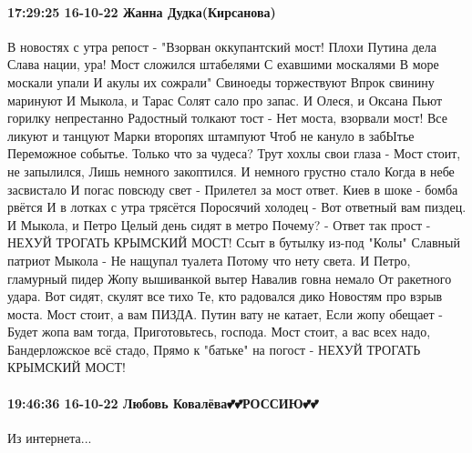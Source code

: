  
 
 
 
 

\paragraph{17:29:25 16-10-22 Жанна Дудка(Кирсанова)}

В новостях с утра репост -
"Взорван оккупантский мост!
Плохи Путина дела
Слава нации, ура!
Мост сложился штабелями
С ехавшими москалями
В море москали упали
И акулы их сожрали"
Свиноеды торжествуют
Впрок свинину маринуют
И Мыкола, и Тарас
Солят сало про запас.
И Олеся, и Оксана
Пьют горилку непрестанно
Радостный толкают тост -
Нет моста, взорвали мост!
Все ликуют и танцуют
Марки второпях штампуют
Чтоб не кануло в забЫтье
Переможное событье.
Только что за чудеса?
Трут хохлы свои глаза -
Мост стоит, не запылился,
Лишь немного закоптился.
И немного грустно стало
Когда в небе засвистало
И погас повсюду свет -
Прилетел за мост ответ.
Киев в шоке - бомба рвётся
И в лотках с утра трясётся
Поросячий холодец -
Вот ответный вам пиздец.
И Мыкола, и Петро
Целый день сидят в метро
Почему? - Ответ так прост -
НЕХУЙ ТРОГАТЬ КРЫМСКИЙ МОСТ!
Ссыт в бутылку из-под "Колы"
Славный патриот Мыкола -
Не нащупал туалета
Потому что нету света.
И Петро, гламурный пидер
Жопу вышиванкой вытер
Навалив говна немало
От ракетного удара.
Вот сидят, скулят все тихо
Те, кто радовался дико
Новостям про взрыв моста.
Мост стоит, а вам ПИЗДА.
Путин вату не катает,
Если жопу обещает -
Будет жопа вам тогда,
Приготовьтесь, господа.
Мост стоит, а вас всех надо,
Бандерложское всё стадо,
Прямо к "батьке" на погост -
НЕХУЙ ТРОГАТЬ КРЫМСКИЙ МОСТ!

\paragraph{19:46:36 16-10-22 Любовь Ковалёва💕💕РОССИЮ💕💕}

Из интернета...

